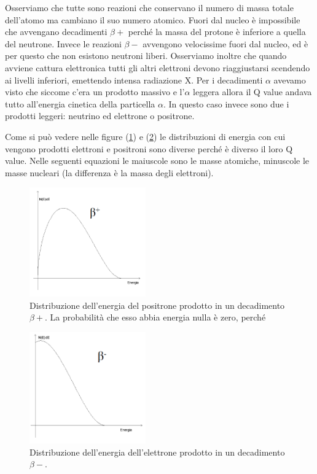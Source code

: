 Osserviamo che tutte sono reazioni che conservano il numero di massa totale dell'atomo ma cambiano il suo numero atomico.
Fuori dal nucleo è impossibile che avvengano decadimenti $\beta+$ perché la massa del protone è inferiore a quella del neutrone. Invece le reazioni $\beta-$ avvengono velocissime fuori dal nucleo, ed è per questo che non esistono neutroni liberi.
Osserviamo inoltre che quando avviene cattura elettronica tutti gli altri elettroni devono riaggiustarsi scendendo ai livelli inferiori, emettendo intensa radiazione X.
Per i decadimenti $\alpha$ avevamo visto che siccome c'era un prodotto massivo e l'$\alpha$ leggera allora il Q value andava tutto all'energia cinetica della particella $\alpha$. In questo caso invece sono due i prodotti leggeri: neutrino ed elettrone o positrone.

 Come si può vedere nelle figure (\ref{qbetapiu}) e (\ref{qbetameno}) le distribuzioni di energia con cui vengono prodotti elettroni e positroni sono diverse perché è diverso il loro Q value. Nelle seguenti equazioni le maiuscole sono le masse atomiche, minuscole le masse nucleari (la differenza è la massa degli elettroni).

\begin{figure}
\centering
		\includegraphics[width=5cm, keepaspectratio]{figs/qbetapiu.png}
		\caption{Distribuzione dell'energia del positrone prodotto in un decadimento $\beta+$. La probabilità che esso abbia energia nulla è zero, perché}
         \label{qbetapiu}
\end{figure}

\begin{figure}
\centering
		\includegraphics[width=5cm, keepaspectratio]{figs/qbetameno.png}
		\caption{Distribuzione dell'energia dell'elettrone prodotto in un decadimento $\beta-$.}
         \label{qbetameno}
\end{figure}

